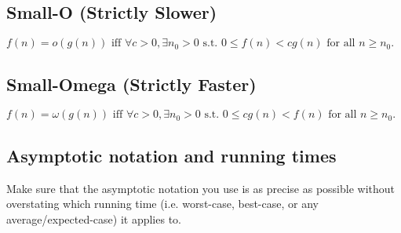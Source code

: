 \subsection{Small-O (Strictly Slower)}
\begin{definition}
    $f(n) = o(g(n)) \text{ iff } \forall c > 0, \exists n_0 > 0 \text{ s.t. } 0 \leq f(n) < c g(n) \text{ for all } n \geq n_0.$
\end{definition}

\subsection{Small-Omega (Strictly Faster)}
\begin{definition}
    $f(n) = \omega(g(n)) \text{ iff } \forall c > 0, \exists n_0 > 0 \text{ s.t. } 0 \leq c g(n) < f(n) \text{ for all } n \geq n_0.$
\end{definition}

\subsection{Asymptotic notation and running times}
    \begin{warning}
        Make sure that the asymptotic notation you use is as precise as possible without overstating which running time (i.e. worst-case, best-case, or any average/expected-case) it applies to.
    \end{warning}

